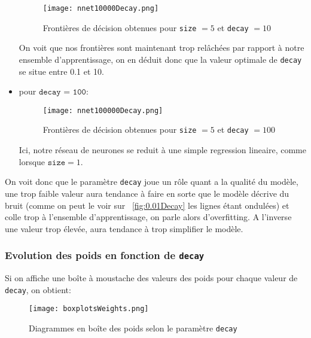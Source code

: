 \documentclass{article}
\begin{document}
\begin{multicols}{2}
\begin{itemize}
\begin{figure}[H]
            \begin{center}
                \texttt{[image: nnet10000Decay.png]}
                \centering
                \captionsetup{justification=centering}
                \caption{\label{fig:10Decay}Frontières de décision obtenues pour \texttt{size} $= 5$ et \texttt{decay} $= 10$}
            \end{center}
        \end{figure}
        On voit que nos frontières sont maintenant trop relâchées par rapport
        à notre ensemble d'apprentissage, on en déduit donc que la valeur
        optimale de \texttt{decay} se situe entre 0.1 et 10.
    \item pour $\texttt{decay = 100}$:
        \begin{figure}[H]
            \begin{center}
                \texttt{[image: nnet100000Decay.png]}
                \centering
                \captionsetup{justification=centering}
                \caption{\label{fig:100Decay}Frontières de décision obtenues pour \texttt{size} $= 5$ et \texttt{decay} $= 100$}
            \end{center}
        \end{figure}
        Ici, notre réseau de neurones se reduit à une simple regression
        lineaire, comme lorsque $\texttt{size} = 1$.
\end{itemize}

On voit donc que le paramètre \texttt{decay} joue un rôle quant a la qualité du
modèle, une trop faible valeur aura tendance à faire en sorte que le
modèle décrive du bruit (comme on peut le voir sur ~\ref{fig:0.01Decay} les
lignes étant ondulées) et colle trop à l'ensemble d'apprentissage, on parle
alors d'overfitting. A l'inverse une valeur trop élevée, aura tendance à trop
simplifier le modèle.

\subsubsection{Evolution des poids en fonction de \texttt{decay}}\label{subsubsec:ex242}

Si on affiche une boîte à moustache des valeurs des poids pour chaque valeur
de \texttt{decay}, on obtient:

\begin{figure}[H]
    \begin{center}
        \texttt{[image: boxplotsWeights.png]}
        \centering
        \captionsetup{justification=centering}
        \caption{\label{fig:boxplots}Diagrammes en boîte des poids selon le paramètre \texttt{decay}}
    \end{center}
\end{figure}


\end{multicols}
\end{document}

